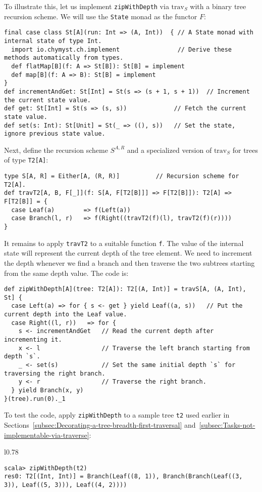 To illustrate this, let us implement \lstinline!zipWithDepth! via
$\text{trav}_{S}$ with a binary tree recursion scheme. We will use
the \lstinline!State! monad as the functor $F$:
\begin{lstlisting}
final case class St[A](run: Int => (A, Int))  { // A State monad with internal state of type Int.
  import io.chymyst.ch.implement                // Derive these methods automatically from types.
  def flatMap[B](f: A => St[B]): St[B] = implement
  def map[B](f: A => B): St[B] = implement
}
def incrementAndGet: St[Int] = St(s => (s + 1, s + 1))  // Increment the current state value.
def get: St[Int] = St(s => (s, s))             // Fetch the current state value.
def set(s: Int): St[Unit] = St(_ => ((), s))   // Set the state, ignore previous state value.
\end{lstlisting}
Next, define the recursion scheme $S^{A,R}$ and a specialized version
of $\text{trav}_{S}$ for trees of type \lstinline!T2[A]!:
\begin{lstlisting}
type S[A, R] = Either[A, (R, R)]          // Recursion scheme for T2[A].
def travT2[A, B, F[_]](f: S[A, F[T2[B]]] => F[T2[B]]): T2[A] => F[T2[B]] = {
  case Leaf(a)        => f(Left(a))
  case Branch(l, r)   => f(Right((travT2(f)(l), travT2(f)(r))))
}
\end{lstlisting}
It remains to apply \lstinline!travT2! to a suitable function \lstinline!f!.
The value of the internal state will represent the current depth of
the tree element. We need to increment the depth whenever we find
a branch and then traverse the two subtrees starting from the same
depth value. The code is:
\begin{lstlisting}
def zipWithDepth[A](tree: T2[A]): T2[(A, Int)] = travS[A, (A, Int), St] {
  case Left(a) => for { s <- get } yield Leaf((a, s))   // Put the current depth into the Leaf value.
  case Right((l, r))   => for {
    s <- incrementAndGet   // Read the current depth after incrementing it.
    x <- l                 // Traverse the left branch starting from depth `s`.
    _ <- set(s)            // Set the same initial depth `s` for traversing the right branch.       
    y <- r                 // Traverse the right branch.
  } yield Branch(x, y)
}(tree).run(0)._1
\end{lstlisting}
To test the code, apply \lstinline!zipWithDepth! to a sample tree
\lstinline!t2! used earlier in Sections~\ref{subsec:Decorating-a-tree-breadth-first-traversal}
and~\ref{subsec:Tasks-not-implementable-via-traverse}:

\begin{wrapfigure}{l}{0.78\columnwidth}%
\vspace{-0.75\baselineskip}
\begin{lstlisting}
scala> zipWithDepth(t2)
res0: T2[(Int, Int)] = Branch(Leaf((8, 1)), Branch(Branch(Leaf((3, 3)), Leaf((5, 3))), Leaf((4, 2))))
\end{lstlisting}

\vspace{-0.5\baselineskip}
\end{wrapfigure}%

